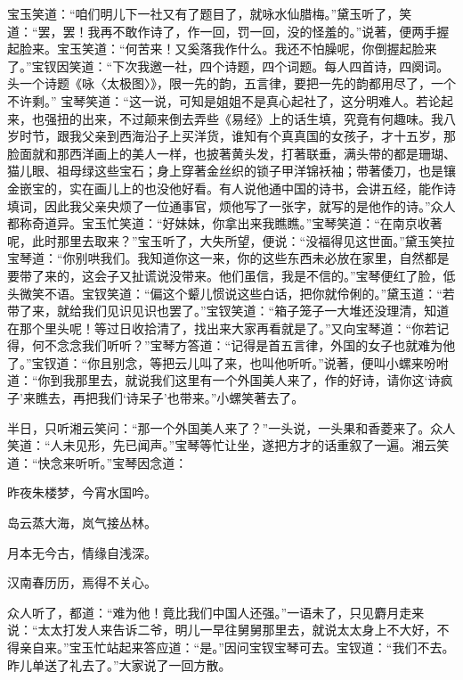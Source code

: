 \begin{parag}
    宝玉笑道：“咱们明儿下一社又有了题目了，就咏水仙腊梅。”黛玉听了，笑道：“罢，罢！我再不敢作诗了，作一回，罚一回，没的怪羞的。”说著，便两手握起脸来。宝玉笑道：“何苦来！又奚落我作什么。我还不怕臊呢，你倒握起脸来了。”宝钗因笑道：“下次我邀一社，四个诗题，四个词题。每人四首诗，四阕词。头一个诗题《咏〈太极图〉》，限一先的韵，五言律，要把一先的韵都用尽了，一个不许剩。” 宝琴笑道：“这一说，可知是姐姐不是真心起社了，这分明难人。若论起来，也强扭的出来，不过颠来倒去弄些《易经》上的话生填，究竟有何趣味。我八岁时节，跟我父亲到西海沿子上买洋货，谁知有个真真国的女孩子，才十五岁，那脸面就和那西洋画上的美人一样，也披著黄头发，打著联垂，满头带的都是珊瑚、猫儿眼、祖母绿这些宝石；身上穿著金丝织的锁子甲洋锦袄袖；带著倭刀，也是镶金嵌宝的，实在画儿上的也没他好看。有人说他通中国的诗书，会讲五经，能作诗填词，因此我父亲央烦了一位通事官，烦他写了一张字，就写的是他作的诗。”众人都称奇道异。宝玉忙笑道：“好妹妹，你拿出来我瞧瞧。”宝琴笑道：“在南京收著呢，此时那里去取来？”宝玉听了，大失所望，便说：“没福得见这世面。”黛玉笑拉宝琴道：“你别哄我们。我知道你这一来，你的这些东西未必放在家里，自然都是要带了来的，这会子又扯谎说没带来。他们虽信，我是不信的。”宝琴便红了脸，低头微笑不语。宝钗笑道：“偏这个颦儿惯说这些白话，把你就伶俐的。”黛玉道：“若带了来，就给我们见识见识也罢了。”宝钗笑道：“箱子笼子一大堆还没理清，知道在那个里头呢！等过日收拾清了，找出来大家再看就是了。”又向宝琴道：“你若记得，何不念念我们听听？”宝琴方答道：“记得是首五言律，外国的女子也就难为他了。”宝钗道：“你且别念，等把云儿叫了来，也叫他听听。”说著，便叫小螺来吩咐道：“你到我那里去，就说我们这里有一个外国美人来了，作的好诗，请你这‘诗疯子’来瞧去，再把我们‘诗呆子’也带来。”小螺笑著去了。
\end{parag}


\begin{parag}
    半日，只听湘云笑问：“那一个外国美人来了？”一头说，一头果和香菱来了。众人笑道：“人未见形，先已闻声。”宝琴等忙让坐，遂把方才的话重叙了一遍。湘云笑道：“快念来听听。”宝琴因念道：
\end{parag}
\begin{poem}

    \begin{pl}

        昨夜朱楼梦，今宵水国吟。
    \end{pl}
    \begin{pl}

        岛云蒸大海，岚气接丛林。
    \end{pl}
    \begin{pl}

        月本无今古，情缘自浅深。
    \end{pl}
    \begin{pl}

        汉南春历历，焉得不关心。
    \end{pl}

\end{poem}
\begin{parag}
    众人听了，都道：“难为他！竟比我们中国人还强。”一语未了，只见麝月走来说：“太太打发人来告诉二爷，明儿一早往舅舅那里去，就说太太身上不大好，不得亲自来。”宝玉忙站起来答应道：“是。”因问宝钗宝琴可去。宝钗道：“我们不去。昨儿单送了礼去了。”大家说了一回方散。
\end{parag}


